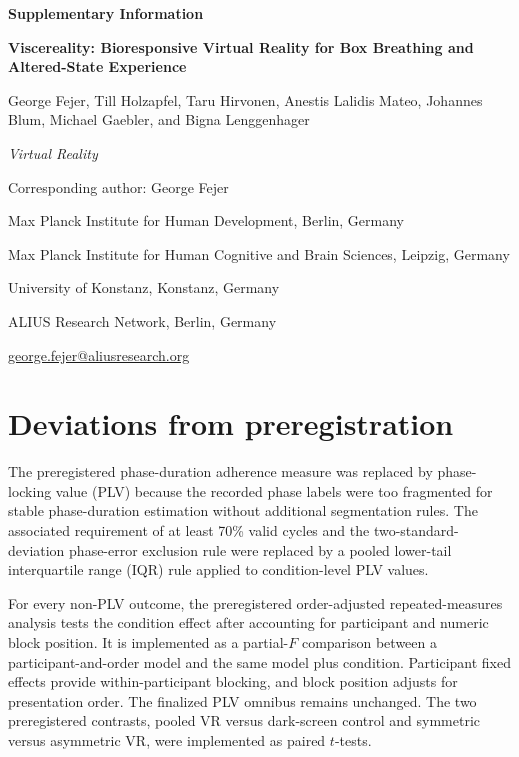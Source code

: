 \documentclass[pdflatex,sn-basic,lineno]{../sn-jnl}
\begin{document}
\begin{center}
{\Large\bfseries Supplementary Information\par}
\vspace{1em}
{\large\bfseries Viscereality: Bioresponsive Virtual Reality for Box Breathing and Altered-State Experience\par}
\vspace{0.75em}
George Fejer, Till Holzapfel, Taru Hirvonen, Anestis Lalidis Mateo,
Johannes Blum, Michael Gaebler, and Bigna Lenggenhager\par
\vspace{0.5em}
\textit{Virtual Reality}\par
\vspace{0.5em}
Corresponding author: George Fejer\par
Max Planck Institute for Human Development, Berlin, Germany\par
Max Planck Institute for Human Cognitive and Brain Sciences, Leipzig, Germany\par
University of Konstanz, Konstanz, Germany\par
ALIUS Research Network, Berlin, Germany\par
\href{mailto:george.fejer@aliusresearch.org}{george.fejer@aliusresearch.org}
\end{center}

\section{Deviations from preregistration}
\label{sec:supp_deviations}

The preregistered phase-duration adherence measure was replaced by phase-locking value (PLV) because the recorded phase labels were too fragmented for stable phase-duration estimation without additional segmentation rules. The associated requirement of at least 70\% valid cycles and the two-standard-deviation phase-error exclusion rule were replaced by a pooled lower-tail interquartile range (IQR) rule applied to condition-level PLV values.

For every non-PLV outcome, the preregistered order-adjusted repeated-measures analysis tests the condition effect after accounting for participant and numeric block position. It is implemented as a partial-$F$ comparison between a participant-and-order model and the same model plus condition. Participant fixed effects provide within-participant blocking, and block position adjusts for presentation order. The finalized PLV omnibus remains unchanged. The two preregistered contrasts, pooled VR versus dark-screen control and symmetric versus asymmetric VR, were implemented as paired $t$-tests.
\end{document}
